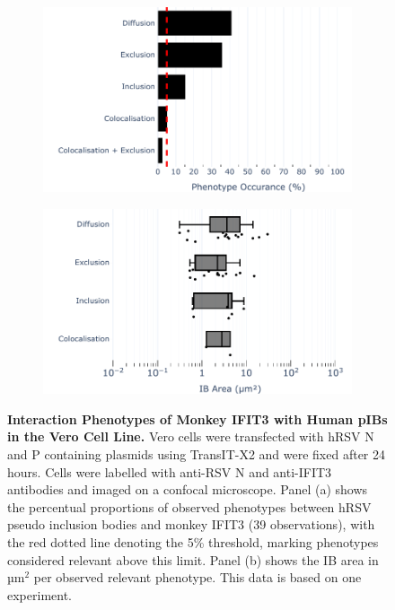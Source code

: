 \begin{figure}
    \begin{subfigure}{0.495\textwidth}
        \caption{}
        \includegraphics[width=1\linewidth]{09. Chapter 4/Figs/01. pIB/04. IFIT3/01. bar_i3_vero.pdf} 
    \end{subfigure}
    \begin{subfigure}{0.495\textwidth}
        \caption{}
        \includegraphics[width=1\linewidth]{09. Chapter 4/Figs/01. pIB/04. IFIT3/02. box_i3_vero.pdf}
    \end{subfigure}
    \caption[Interaction Phenotypes of Monkey IFIT3 with Human pIBs in the Vero Cell Line.]{\textbf{Interaction Phenotypes of Monkey IFIT3 with Human pIBs in the Vero Cell Line.} Vero cells were transfected with hRSV N and P containing plasmids using TransIT-X2 and were fixed after 24 hours. Cells were labelled with anti-RSV N and anti-IFIT3 antibodies and imaged on a confocal microscope. Panel (a) shows the percentual proportions of observed phenotypes between hRSV pseudo inclusion bodies and monkey IFIT3 (39 observations), with the red dotted line denoting the 5\% threshold, marking phenotypes considered relevant above this limit. Panel (b) shows the IB area in \(\mbox{µm}^2\) per observed relevant phenotype. This data is based on one experiment.}
    \label{fig:Interaction Phenotypes of Monkey IFIT3 with Human pIBs in the VERO Cell Line}
\end{figure}

